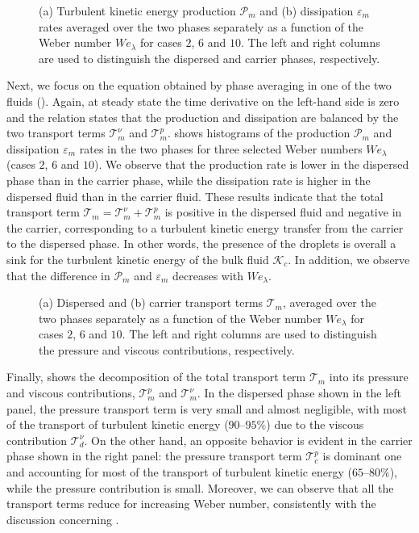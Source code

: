 \begin{figure}
	\centering
	 \hspace{0.5cm}
	 \vspace{0.5cm}
	\caption{(a) Turbulent kinetic energy production $\mathcal{P}_m$ and (b) dissipation $\varepsilon_m$ rates averaged over the two phases separately as a function of the Weber number $We_\lambda$ for cases $2$, $6$ and $10$. The left and right columns are used to distinguish the dispersed and carrier phases, respectively.}
	\label{fig:tkem}
\end{figure}
Next, we focus on the equation obtained by phase averaging in one of the two fluids (). Again, at steady state the time derivative on the left-hand side is zero and the relation states that the production and dissipation are balanced by the two transport terms $\mathcal{T}^\nu_m$ and $\mathcal{T}^p_m$.  shows histograms of the production $\mathcal{P}_m$ and dissipation $\varepsilon_m$ rates in the two phases for three selected Weber numbers $We_\lambda$ (cases $2$, $6$ and $10$). We observe that the production rate is lower in the dispersed phase than in the carrier phase, while the dissipation rate is higher in the dispersed fluid than in the carrier fluid. These results indicate that the total transport term $\mathcal{T}_m=\mathcal{T}^\nu_m + \mathcal{T}^p_m$ is positive in the dispersed fluid and negative in the carrier, corresponding to a turbulent kinetic energy transfer from the carrier to the dispersed phase. In other words, the presence of the droplets is overall a sink for the turbulent kinetic energy of the bulk fluid $\mathcal{K}_c$. In addition, we observe that the difference in $\mathcal{P}_m$ and $\varepsilon_m$ decreases with $We_\lambda$.

\begin{figure}
	\centering
	 \hspace{0.5cm}
	 \vspace{0.5cm}
	\caption{(a) Dispersed and (b) carrier transport terms $\mathcal{T}_m$, averaged over the two phases separately as a function of the Weber number $We_\lambda$ for cases $2$, $6$ and $10$. The left and right columns are used to distinguish the pressure and viscous contributions, respectively.}
	\label{fig:tkem_tran}
\end{figure}
Finally,  shows the decomposition of the total transport term $\mathcal{T}_m$ into its pressure and viscous contributions, $\mathcal{T}^p_m$ and $\mathcal{T}^\nu_m$. In the dispersed phase shown in the left panel, the pressure transport term is very small and almost negligible, with most of the transport of turbulent kinetic energy ($90$--$95\%$) due to the viscous contribution $\mathcal{T}^\nu_d$. On the other hand, an opposite behavior is evident in the carrier phase shown in the right panel: the pressure transport term $\mathcal{T}^p_c$ is dominant one and accounting for most of the transport of turbulent kinetic energy ($65$--$80\%$), while the pressure contribution is small. Moreover, we can observe that all the transport terms reduce for increasing Weber number, consistently with the discussion concerning .

